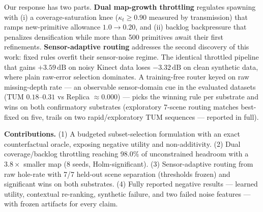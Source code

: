 \documentclass[10pt,twocolumn,letterpaper]{article}
\begin{document}
Our response has two parts.
\textbf{Dual map-growth throttling} regulates spawning with (i) a coverage-saturation knee ($\kappa_t \ge 0.90$ measured by transmission) that ramps new-primitive allowance $1.0 \to 0.20$, and (ii) backlog backpressure that penalizes densification while more than 500 primitives await their first refinements.
\textbf{Sensor-adaptive routing} addresses the second discovery of this work: fixed rules overfit their sensor-noise regime.
The identical throttled pipeline that gains $+3.59\,\mathrm{dB}$ on noisy Kinect data loses $-3.32\,\mathrm{dB}$ on clean synthetic data, where plain raw-error selection dominates.
A training-free router keyed on raw missing-depth rate --- an observable sensor-domain cue in the evaluated datasets (TUM $0.18$--$0.31$ vs Replica $\approx 0.000$) --- picks the winning rule per substrate and wins on both confirmatory substrates (exploratory 7-scene routing matches best-fixed on five, trails on two rapid/exploratory TUM sequences --- reported in full).

\textbf{Contributions.}
(1) A budgeted subset-selection formulation with an exact counterfactual oracle, exposing negative utility and non-additivity.
(2) Dual coverage/backlog throttling reaching 98.0\% of unconstrained headroom with a $3.8\times$ smaller map (8 seeds, Holm-significant).
(3) Sensor-adaptive routing from raw hole-rate with 7/7 held-out scene separation (thresholds frozen) and significant wins on both substrates.
(4) Fully reported negative results --- learned utility, contextual re-ranking, synthetic failure, and two failed noise features --- with frozen artifacts for every claim.
\end{document}
